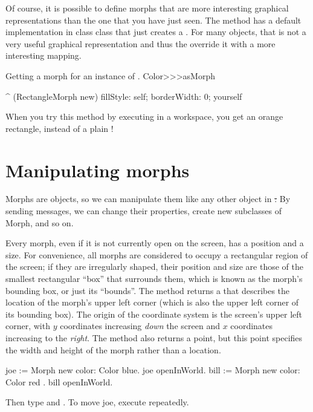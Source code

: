 \documentclass[a4paper,10pt,twoside]{book}
\begin{document}
Of course, it is possible to define morphs that are more interesting graphical representations than the one that you have just seen.
The method  has a default implementation in class  class that just creates a .
For many objects, that is not a very useful graphical representation and thus the override it with a more interesting mapping.

\begin{method}{Getting a morph for an instance of .}
Color>>>asMorph

	^ (RectangleMorph new)
		fillStyle: self;
		borderWidth: 0;
		yourself
\end{method}
\noindent

When you try this method by executing   in a workspace, you get an orange rectangle, instead of a plain !

\section{Manipulating morphs}

Morphs are objects, so we can manipulate them like any other object in \st:
By sending messages, we can change their properties, create new subclasses of Morph, and so on.

Every morph, even if it is not currently open on the screen, has a position and a size.  
For convenience, all morphs are considered to occupy a rectangular region of the screen; if they are irregularly shaped, their position and size are those of the smallest rectangular ``box'' that surrounds them, which is known as the morph's bounding box, or just its ``bounds''.
The  method returns a  that describes the location of the morph's upper left corner (which is also the upper left corner of its bounding box).
The origin of the coordinate system is the screen's upper left corner, with $y$ coordinates increasing \emph{down} the screen and $x$ coordinates increasing to the \emph{right}.
The  method also returns a point, but this point specifies the width and height of the morph rather than a location.

\begin{code}{}
joe := Morph new color: Color blue.
joe openInWorld.
bill := Morph new color: Color red .
bill openInWorld.
\end{code}
\noindent
Then type  and .
To move joe, execute  repeatedly.
\end{document}
